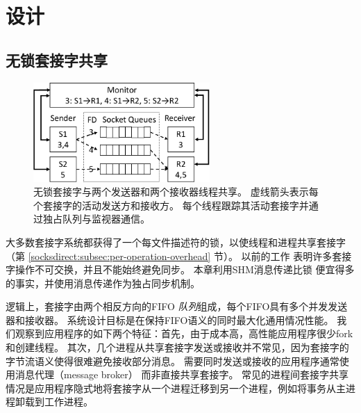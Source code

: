 
\section{设计}
\label{socksdirect:sec:design}


\subsection{无锁套接字共享}
\label{socksdirect:subsec:fork}


\begin{figure}[htbp]
	\centering
	\includegraphics[width=0.6\textwidth]{images/queue_arch}
	
	\caption{无锁套接字与两个发送器和两个接收器线程共享。 虚线箭头表示每个套接字的活动发送方和接收方。 每个线程跟踪其活动套接字并通过独占队列与监视器通信。}
	\label{socksdirect:fig:queue-arch}
\end{figure}

大多数套接字系统都获得了一个每文件描述符的锁，以使线程和进程共享套接字（第 \ref {socksdirect:subsec:per-operation-overhead} 节）。
以前的工作 \cite {boyd2010analysis,clements2015scalable} 表明许多套接字操作不可交换，并且不能始终避免同步。
本章利用SHM消息传递比锁 \cite {roghanchi2017ffwd} 便宜得多的事实，并使用消息传递作为独占同步机制。

逻辑上，套接字由两个相反方向的FIFO \emph {队列}组成，每个FIFO具有多个并发发送器和接收器。
系统设计目标是在保持FIFO语义的同时最大化通用情况性能。
我们观察到应用程序的如下两个特征：首先，由于成本高，高性能应用程序很少fork和创建线程。
其次，几个进程从共享套接字发送或接收并不常见，因为套接字的字节流语义使得很难避免接收部分消息。
需要同时发送或接收的应用程序通常使用消息代理（message broker） \cite {hintjens2013zeromq,rabbitmq2017rabbitmq,kreps2011kafka} 而非直接共享套接字。
常见的进程间套接字共享情况是应用程序隐式地将套接字从一个进程迁移到另一个进程，例如将事务从主进程卸载到工作进程。

